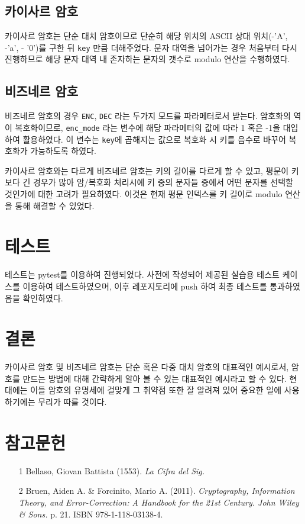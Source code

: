 \documentclass{article}
\begin{document}
    \subsection{카이사르 암호}
    카이사르 암호는 단순 대치 암호이므로 단순히 해당 위치의 ASCII 상대 위치(-'A', -'a', - '0')를 구한 뒤 \texttt{key} 만큼 더해주었다.
    문자 대역을 넘어가는 경우 처음부터 다시 진행하므로 해당 문자 대역 내 존자하는 문자의 갯수로 modulo 연산을 수행하였다.

    \subsection{비즈네르 암호}
    비즈네르 암호의 경우 \texttt{ENC}, \texttt{DEC} 라는 두가지 모드를 파라메터로서 받는다. 암호화의 역이 복호화이므로, \texttt{enc\_mode}
    라는 변수에 해당 파라메터의 값에 따라 1 혹은 -1을 대입하여 활용하였다. 이 변수는 \texttt{key}에 곱해지는 값으로 복호화 시
    키를 음수로 바꾸어 복호화가 가능하도록 하였다.

    카이사르 암호와는 다르게 비즈네르 암호는 키의 길이를 다르게 할 수 있고, 평문이 키보다 긴 경우가 많아 암/복호화 처리시에 키 중의 문자들 중에서
    어떤 문자를 선택할 것인가에 대한 고려가 필요하였다. 이것은 현재 평문 인덱스를 키 길이로 modulo 연산을 통해 해결할 수 있었다.

    \section{테스트}
    테스트는 pytest를 이용하여 진행되었다. 사전에 작성되어 제공된 실습용 테스트 케이스를 이용하여 테스트하였으며, 이후
    레포지토리에 push 하여 최종 테스트를 통과하였음을 확인하였다.

    \section{결론}
    카이사르 암호 및 비즈네르 암호는 단순 혹은 다중 대치 암호의 대표적인 예시로서, 암호를 만드는 방법에 대해 간략하게 알아 볼 수
    있는 대표적인 예시라고 할 수 있다. 현대에는 이들 암호의 유명세에 걸맞게 그 취약점 또한 잘 알려져 있어 중요한 일에 사용하기에는
    무리가 따를 것이다.


    \section*{참고문헌}
        \begin{itemize}
            \item [1] Bellaso, Giovan Battista (1553). \textit{La Cifra del Sig.}
            \item [2] Bruen, Aiden A. \& Forcinito, Mario A. (2011). \textit{Cryptography, Information Theory, and Error-Correction: A Handbook for the 21st Century. John Wiley \& Sons.} p. 21. ISBN 978-1-118-03138-4. 
        \end{itemize}
\end{document}
